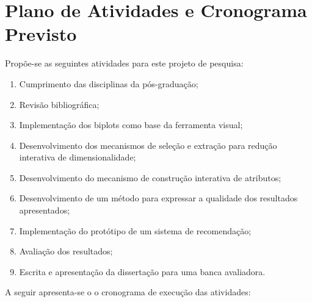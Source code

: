 \section{Plano de Atividades e Cronograma Previsto}\label{sec:cron}

Propõe-se as seguintes atividades para este projeto de
pesquisa:

\begin{enumerate}
    \item Cumprimento das disciplinas da pós-graduação;

    \item Revisão bibliográfica;

    \item Implementação dos biplots como base da
        ferramenta visual;

    \item Desenvolvimento dos mecanismos de seleção e
        extração para redução interativa de
        dimensionalidade;

    \item Desenvolvimento do mecanismo de construção
        interativa de atributos;

    \item Desenvolvimento de um método para expressar
        a qualidade dos resultados apresentados;

    \item Implementação do protótipo de um sistema de
        recomendação;

    \item Avaliação dos resultados;

    \item Escrita e apresentação da dissertação para uma banca
        avaliadora. 
\end{enumerate}

A seguir apresenta-se o o cronograma de execução das
atividades:

\newcommand{\x}{\hspace*{30pt}}
\newcommand{\y}{\color{black}\rule{30pt}{7pt}}
\renewcommand{\r}{\color{gray_c}\rule{30pt}{7pt}}
\setlength{\tabcolsep}{0pt}

